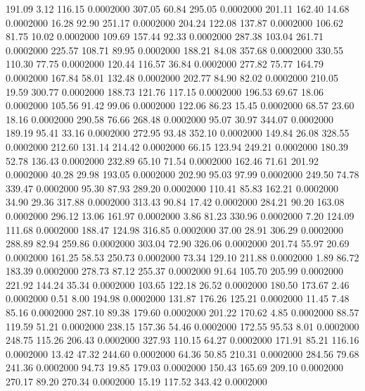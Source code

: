  191.09    3.12  116.15   0.0002000
 307.05   60.84  295.05   0.0002000
 201.11  162.40   14.68   0.0002000
  16.28   92.90  251.17   0.0002000
 204.24  122.08  137.87   0.0002000
 106.62   81.75   10.02   0.0002000
 109.69  157.44   92.33   0.0002000
 287.38  103.04  261.71   0.0002000
 225.57  108.71   89.95   0.0002000
 188.21   84.08  357.68   0.0002000
 330.55  110.30   77.75   0.0002000
 120.44  116.57   36.84   0.0002000
 277.82   75.77  164.79   0.0002000
 167.84   58.01  132.48   0.0002000
 202.77   84.90   82.02   0.0002000
 210.05   19.59  300.77   0.0002000
 188.73  121.76  117.15   0.0002000
 196.53   69.67   18.06   0.0002000
 105.56   91.42   99.06   0.0002000
 122.06   86.23   15.45   0.0002000
  68.57   23.60   18.16   0.0002000
 290.58   76.66  268.48   0.0002000
  95.07   30.97  344.07   0.0002000
 189.19   95.41   33.16   0.0002000
 272.95   93.48  352.10   0.0002000
 149.84   26.08  328.55   0.0002000
 212.60  131.14  214.42   0.0002000
  66.15  123.94  249.21   0.0002000
 180.39   52.78  136.43   0.0002000
 232.89   65.10   71.54   0.0002000
 162.46   71.61  201.92   0.0002000
  40.28   29.98  193.05   0.0002000
 202.90   95.03   97.99   0.0002000
 249.50   74.78  339.47   0.0002000
  95.30   87.93  289.20   0.0002000
 110.41   85.83  162.21   0.0002000
  34.90   29.36  317.88   0.0002000
 313.43   90.84   17.42   0.0002000
 284.21   90.20  163.08   0.0002000
 296.12   13.06  161.97   0.0002000
   3.86   81.23  330.96   0.0002000
   7.20  124.09  111.68   0.0002000
 188.47  124.98  316.85   0.0002000
  37.00   28.91  306.29   0.0002000
 288.89   82.94  259.86   0.0002000
 303.04   72.90  326.06   0.0002000
 201.74   55.97   20.69   0.0002000
 161.25   58.53  250.73   0.0002000
  73.34  129.10  211.88   0.0002000
   1.89   86.72  183.39   0.0002000
 278.73   87.12  255.37   0.0002000
  91.64  105.70  205.99   0.0002000
 221.92  144.24   35.34   0.0002000
 103.65  122.18   26.52   0.0002000
 180.50  173.67    2.46   0.0002000
   0.51    8.00  194.98   0.0002000
 131.87  176.26  125.21   0.0002000
  11.45    7.48   85.16   0.0002000
 287.10   89.38  179.60   0.0002000
 201.22  170.62    4.85   0.0002000
  88.57  119.59   51.21   0.0002000
 238.15  157.36   54.46   0.0002000
 172.55   95.53    8.01   0.0002000
 248.75  115.26  206.43   0.0002000
 327.93  110.15   64.27   0.0002000
 171.91   85.21  116.16   0.0002000
  13.42   47.32  244.60   0.0002000
  64.36   50.85  210.31   0.0002000
 284.56   79.68  241.36   0.0002000
  94.73   19.85  179.03   0.0002000
 150.43  165.69  209.10   0.0002000
 270.17   89.20  270.34   0.0002000
  15.19  117.52  343.42   0.0002000
